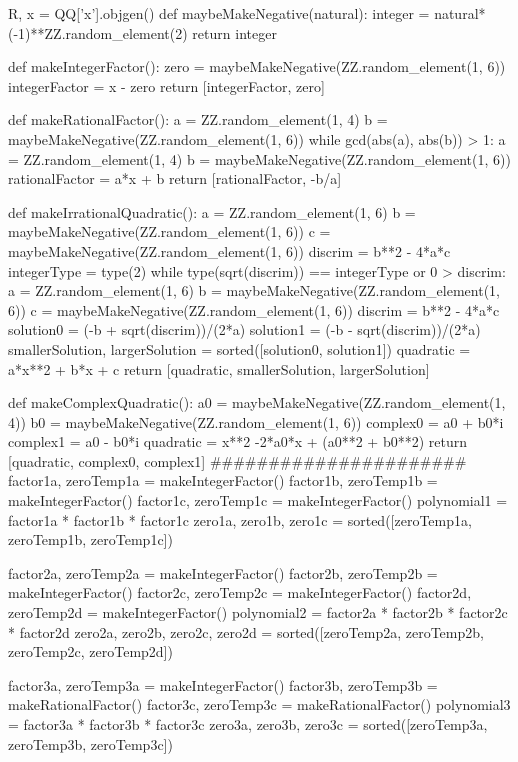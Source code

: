\documentclass{ximera}
\begin{document}
\begin{sagesilent}
R, x = QQ['x'].objgen()
def maybeMakeNegative(natural):
    integer = natural*(-1)**ZZ.random_element(2)
    return integer
 
def makeIntegerFactor():
    zero = maybeMakeNegative(ZZ.random_element(1, 6))
    integerFactor = x - zero
    return [integerFactor, zero]
 
def makeRationalFactor():
    a = ZZ.random_element(1, 4)
    b = maybeMakeNegative(ZZ.random_element(1, 6))
    while gcd(abs(a), abs(b)) > 1:
        a = ZZ.random_element(1, 4)
        b = maybeMakeNegative(ZZ.random_element(1, 6))
    rationalFactor = a*x + b
    return [rationalFactor, -b/a]
 
def makeIrrationalQuadratic():
    a = ZZ.random_element(1, 6)
    b = maybeMakeNegative(ZZ.random_element(1, 6))
    c = maybeMakeNegative(ZZ.random_element(1, 6))
    discrim = b**2 - 4*a*c
    integerType = type(2)
    while type(sqrt(discrim)) == integerType or 0 > discrim:
        a = ZZ.random_element(1, 6)
        b = maybeMakeNegative(ZZ.random_element(1, 6))
        c = maybeMakeNegative(ZZ.random_element(1, 6))
        discrim = b**2 - 4*a*c
    solution0 = (-b + sqrt(discrim))/(2*a)
    solution1 = (-b - sqrt(discrim))/(2*a)
    smallerSolution, largerSolution = sorted([solution0, solution1])
    quadratic = a*x**2 + b*x + c
    return [quadratic, smallerSolution, largerSolution]
 
def makeComplexQuadratic():
    a0 = maybeMakeNegative(ZZ.random_element(1, 4))
    b0 = maybeMakeNegative(ZZ.random_element(1, 6))
    complex0 = a0 + b0*i
    complex1 = a0 - b0*i
    quadratic = x**2 -2*a0*x + (a0**2 + b0**2)
    return [quadratic, complex0, complex1]
######################
factor1a, zeroTemp1a = makeIntegerFactor()
factor1b, zeroTemp1b = makeIntegerFactor()
factor1c, zeroTemp1c = makeIntegerFactor()
polynomial1 = factor1a * factor1b * factor1c
zero1a, zero1b, zero1c = sorted([zeroTemp1a, zeroTemp1b, zeroTemp1c])
 
factor2a, zeroTemp2a = makeIntegerFactor()
factor2b, zeroTemp2b = makeIntegerFactor()
factor2c, zeroTemp2c = makeIntegerFactor()
factor2d, zeroTemp2d = makeIntegerFactor()
polynomial2 = factor2a * factor2b * factor2c * factor2d
zero2a, zero2b, zero2c, zero2d = sorted([zeroTemp2a, zeroTemp2b, zeroTemp2c, zeroTemp2d])
 
factor3a, zeroTemp3a = makeIntegerFactor()
factor3b, zeroTemp3b = makeRationalFactor()
factor3c, zeroTemp3c = makeRationalFactor()
polynomial3 = factor3a * factor3b * factor3c
zero3a, zero3b, zero3c = sorted([zeroTemp3a, zeroTemp3b, zeroTemp3c])
 

\end{sagesilent}
\end{document}

